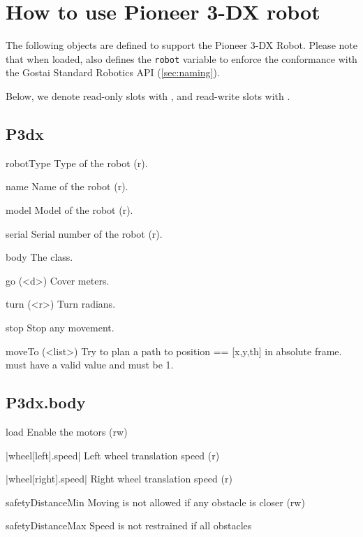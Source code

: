\section{How to use Pioneer 3-DX robot}

The following objects are defined to support the Pioneer 3-DX Robot.  Please
note that when loaded,  also defines the \lstinline{robot}
variable to enforce the conformance with the Gostai Standard Robotics API
(\autoref{sec:naming}).

Below, we denote read-only slots with , and read-write slots with
.

\subsection{P3dx}
\begin{urbiscriptapi}
\item[robotType] Type of the robot (r).
\item[name] Name of the robot (r).
\item[model] Model of the robot (r).
\item[serial] Serial number of the robot (r).
\item[body] The  class.
\item[go](<d>) Cover  meters.
\item[turn](<r>) Turn  radians.
\item[stop] Stop any movement.
\item[moveTo](<list>) Try to plan a path to position  == [x,y,th]
  in absolute frame.   must have a valid value and
   must be 1.
\end{urbiscriptapi}

\subsection{P3dx.body}

\begin{urbiscriptapi}
\item[load] Enable the motors (rw)
\item|wheel[left].speed| Left wheel translation speed (r)
\item|wheel[right].speed| Right wheel translation speed (r)
\item[safetyDistanceMin] Moving is not allowed if any obstacle is closer
  (rw)
\item[safetyDistanceMax] Speed is not restrained if all obstacles
\end{urbiscriptapi}


